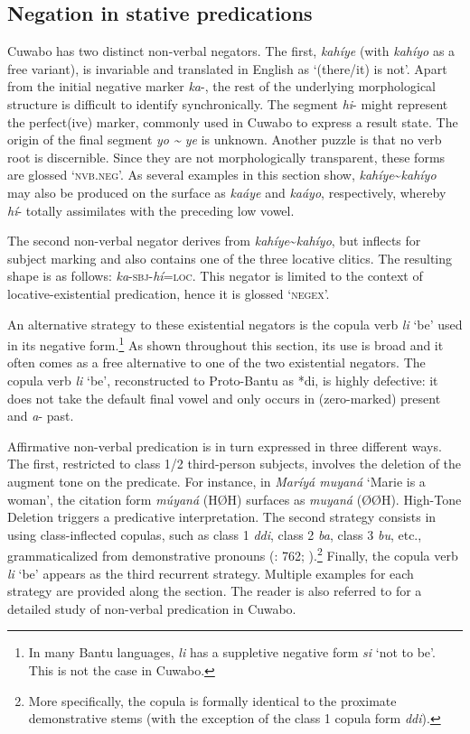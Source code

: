 \documentclass[output=paper,colorlinks=true, citecolor=brown,draftmode]{langscibook}
\begin{document}
\subsection{Negation in stative predications}\label{sec:cuw:2.3} 
Cuwabo has two distinct non-verbal negators. The first, \textit{kahíye} (with \textit{kahíyo} as a free variant), is invariable and translated in English as ‘(there/it) is not’. Apart from the initial negative marker \textit{ka}{}-, the rest of the underlying morphological structure is difficult to identify synchronically. The segment \textit{hi}{}- might represent the perfect(ive) marker, commonly used in Cuwabo to express a result state. The origin of the final segment \textit{yo {\textasciitilde} ye} is unknown. Another puzzle is that no verb root is discernible. Since they are not morphologically transparent, these forms are glossed ‘\textsc{nvb.neg}’. As several examples in this section show, \textit{kahíye}{\textasciitilde}\textit{kahíyo} may also be produced on the surface as \textit{kaáye} and \textit{kaáyo}, respectively, whereby \textit{hí}{}- totally assimilates with the preceding low vowel. 

The second non-verbal negator derives from \textit{kahíye}{\textasciitilde}\textit{kahíyo}, but inflects for subject marking and also contains one of the three locative clitics. The resulting shape is as follows: \textit{ka}{}-\textsc{sbj}{}-\textit{hí}=\textsc{loc}. This negator is limited to the context of locative-existential predication, hence it is glossed ‘\textsc{negex}’. 

An alternative strategy to these existential negators is the copula verb \textit{li} ‘be’ used in its negative form.\footnote{In many Bantu languages, \textit{li} has a suppletive negative form \textit{si} ‘not to be’. This is not the case in Cuwabo.} As shown throughout this section, its use is broad and it often comes as a free alternative to one of the two existential negators. The copula verb \textit{li} ‘be’, reconstructed to Proto-Bantu as *di, is highly defective: it does not take the default final vowel and only occurs in (zero-marked) present and \textit{a}{}- past. 

Affirmative non-verbal predication is in turn expressed in three different ways. The first, restricted to class 1/2 third-person subjects, involves the deletion of the augment tone on the predicate. For instance, in \textit{Maríyá muyaná} ‘Marie is a woman’, the citation form \textit{múyaná} (HØH) surfaces as \textit{muyaná} (ØØH). High-Tone Deletion triggers a predicative interpretation. The second strategy consists in using class-inflected copulas, such as class 1 \textit{ddi}, class 2 \textit{ba}, class 3 \textit{bu}, etc., grammaticalized from demonstrative pronouns (\citealt{Guérois2019}: 762; \citealt{GibsonEtAl2019}).\footnote{More specifically, the copula is formally identical to the proximate demonstrative stems (with the exception of the class 1 copula form \textit{ddi}).} Finally, the copula verb \textit{li} ‘be’ appears as the third recurrent strategy. Multiple examples for each strategy are provided along the section. The reader is also referred to \citet{GuéroisFC} for a detailed study of non-verbal predication in Cuwabo.
\end{document}
